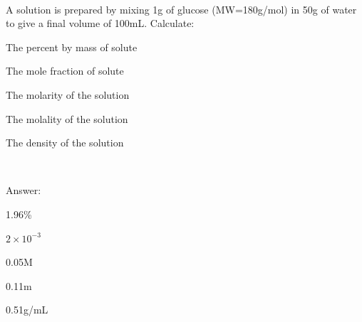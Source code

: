 \documentclass[main.tex]{subfiles}
\begin{document}
\begin{description}
\begin{example}
\faDiamond\ \\
A solution is prepared by mixing 1g of glucose (MW=180g/mol) in 50g of water to give a final volume of 100mL. Calculate: 
\begin{inparaenum}[(a)]	
\item The percent by mass of solute %
\item	 The mole fraction of solute %
\item  The molarity of the solution	%
\item  The molality of the solution	%
\item  The density of the solution	%
\end{inparaenum}\\
\begin{flushright} Answer: \begin{inparaenum}[(a)]	
\item  1.96\%
\item	  $2\times 10^{-3}$
\item   0.05M
\item   0.11m
\item   0.51g/mL
\end{inparaenum}\end{flushright}
\end{example}%



\end{description}
\end{document}
